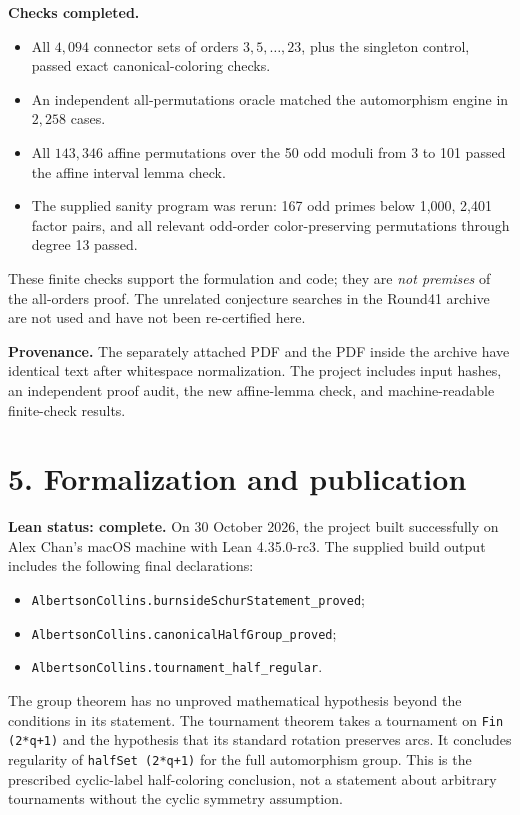 \documentclass[11pt]{article}
\begin{document}
\textbf{Checks completed.}
\begin{itemize}
\item All $4{,}094$ connector sets of orders $3,5,\ldots,23$, plus
the singleton control, passed exact canonical-coloring checks.
\item An independent all-permutations oracle matched the
automorphism engine in $2{,}258$ cases.
\item All $143{,}346$ affine permutations over the 50 odd moduli
from 3 to 101 passed the affine interval lemma check.
\item The supplied sanity program was rerun: 167 odd primes below
1,000, 2,401 factor pairs, and all relevant odd-order color-preserving
permutations through degree 13 passed.
\end{itemize}
These finite checks support the formulation and code; they are
\emph{not premises} of the all-orders proof. The unrelated conjecture
searches in the Round41 archive are not used and have not been
re-certified here.

\textbf{Provenance.} The separately attached PDF and the PDF inside
the archive have identical text after whitespace normalization.
The project includes input hashes, an independent proof audit, the
new affine-lemma check, and machine-readable finite-check results.

\newpage
\section*{5. Formalization and publication}
\textbf{Lean status: complete.} On 30 October 2026, the project built
successfully on Alex Chan's macOS machine with Lean 4.35.0-rc3.
The supplied build output includes the following final declarations:
\begin{itemize}
\item \texttt{AlbertsonCollins.burnsideSchurStatement\_proved};
\item \texttt{AlbertsonCollins.canonicalHalfGroup\_proved};
\item \texttt{AlbertsonCollins.tournament\_half\_regular}.
\end{itemize}
The group theorem has no unproved mathematical hypothesis beyond the
conditions in its statement. The tournament theorem takes a tournament
on \texttt{Fin (2*q+1)} and the hypothesis that its standard rotation
preserves arcs. It concludes regularity of \texttt{halfSet (2*q+1)}
for the full automorphism group. This is the prescribed cyclic-label
half-coloring conclusion, not a statement about arbitrary tournaments
without the cyclic symmetry assumption.
\end{document}
